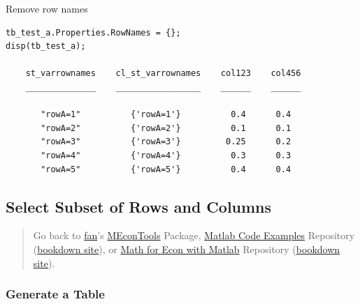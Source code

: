 \documentclass[
]{book}
\begin{document}
Remove row names

\begin{verbatim}
tb_test_a.Properties.RowNames = {};
disp(tb_test_a);

    st_varrownames    cl_st_varrownames    col123    col456
    ______________    _________________    ______    ______

       "rowA=1"          {'rowA=1'}          0.4      0.4  
       "rowA=2"          {'rowA=2'}          0.1      0.1  
       "rowA=3"          {'rowA=3'}         0.25      0.2  
       "rowA=4"          {'rowA=4'}          0.3      0.3  
       "rowA=5"          {'rowA=5'}          0.4      0.4  
\end{verbatim}

\hypertarget{select-subset-of-rows-and-columns}{%
\subsection{Select Subset of Rows and Columns}\label{select-subset-of-rows-and-columns}}

\begin{quote}
Go back to \href{http://fanwangecon.github.io/}{fan}'s \href{https://fanwangecon.github.io/MEconTools/}{MEconTools} Package, \href{https://fanwangecon.github.io/M4Econ/}{Matlab Code Examples} Repository (\href{https://fanwangecon.github.io/M4Econ/bookdown}{bookdown site}), or \href{https://fanwangecon.github.io/Math4Econ/}{Math for Econ with Matlab} Repository (\href{https://fanwangecon.github.io/Math4Econ/bookdown}{bookdown site}).
\end{quote}

\hypertarget{generate-a-table}{%
\subsubsection{Generate a Table}\label{generate-a-table}}
\end{document}
